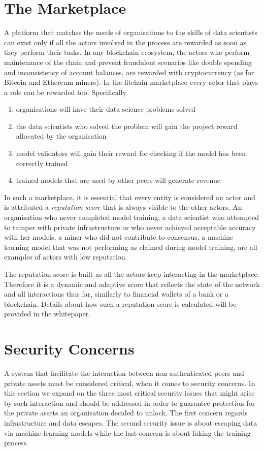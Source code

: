 \documentclass[12pt, a4paper,titlepage]{extreport}
\begin{document}
\section{The Marketplace}
A platform that matches the needs of organisations to the skills of data scientists can exist only if all the actors involved in the process are rewarded as soon as they perform their tasks. In any blockchain ecosystem, the actors who perform maintenance of the chain and prevent fraudulent scenarios like double spending and inconsistency of account balances, are rewarded with cryptocurrency (as for Bitcoin and Ethereum miners). 
In the fitchain marketplace every actor that plays a role can be rewarded too. Specifically

\begin{enumerate}
\item organisations will have their data science problems solved
\item the data scientists who solved the problem will gain the project reward allocated by the organisation
\item model validators will gain their reward for checking if the model has been correctly trained
\item trained models that are used by other peers will generate revenue
\end{enumerate}

In such a marketplace, it is essential that every entity is considered an actor and is attributed a \textit{reputation score} that is always visible to the other actors. 
An organisation who never completed model training, a data scientist who attempted to tamper with private infrastructure or who never achieved acceptable accuracy with her models, a miner who did not contribute to consensus, a machine learning model that was not performing as claimed during model training, are all examples of actors with low reputation.

The reputation score is built as all the actors keep interacting in the marketplace. Therefore it is a dynamic and adaptive score that reflects the state of the network and all interactions thus far, similarly to financial wallets of a bank or a blockchain. 
Details about how such a reputation score is calculated will be provided in the whitepaper.


\pagebreak 
\section{Security Concerns}
A system that facilitate the interaction between non authenticated peers and private assets must be considered critical, when it comes to security concerns. In this section we expand on the three most critical security issues that might arise by such interaction and should be addressed in order to guarantee protection for the private assets an organisation decided to unlock. The first concern regards infrastructure and data escapes. The second security issue is about escaping data via machine learning models while the last concern is about faking the training process.
\end{document}
